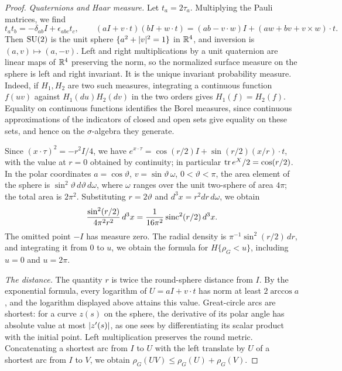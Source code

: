 \begin{proof}
\emph{Quaternions and Haar measure.} Let $t_a=2\tau_a$. Multiplying the Pauli matrices, we find
\begin{equation}\label{ch02:eq:quaternion-product}
 t_at_b=-\delta_{ab}I+\epsilon_{abc}t_c,\qquad
 (aI+v\cdot t)(bI+w\cdot t)=(ab-v\cdot w)I+(aw+bv+v\times w)\cdot t.
\end{equation}
Then $\mathrm{SU}(2)$ is the unit sphere $\{a^2+\lvert v\rvert^2=1\}$ in $\mathbb R^4$, and inversion is $(a,v)\mapsto(a,-v)$. Left and right multiplications by a unit quaternion are linear maps of $\mathbb R^4$ preserving the norm, so the normalized surface measure on the sphere is left and right invariant. It is the unique invariant probability measure. Indeed, if $H_1,H_2$ are two such measures, integrating a continuous function $f(uv)$ against $H_1(du)H_2(dv)$ in the two orders gives $H_1(f)=H_2(f)$. Equality on continuous functions identifies the Borel measures, since continuous approximations of the indicators of closed and open sets give equality on these sets, and hence on the $\sigma$-algebra they generate.

Since $(x\cdot\tau)^2=-r^2I/4$, we have $e^{x\cdot\tau}=\cos(r/2)I+\sin(r/2)(x/r)\cdot t$, with the value at $r=0$ obtained by continuity; in particular $\operatorname{tr} e^X/2=\cos(r/2)$. In the polar coordinates $a=\cos\vartheta$, $v=\sin\vartheta\,\omega$, $0<\vartheta<\pi$, the area element of the sphere is $\sin^2\vartheta\,d\vartheta\,d\omega$, where $\omega$ ranges over the unit two-sphere of area $4\pi$; the total area is $2\pi^2$. Substituting $r=2\vartheta$ and $d^3x=r^2dr\,d\omega$, we obtain
\[
 \frac{\sin^2(r/2)}{4\pi^2r^2}\,d^3x=\frac1{16\pi^2}\operatorname{sinc}^2(r/2)\,d^3x.
\]
The omitted point $-I$ has measure zero. The radial density is $\pi^{-1}\sin^2(r/2)\,dr$, and integrating it from $0$ to $u$, we obtain the formula for $H\{\rho_G<u\}$, including $u=0$ and $u=2\pi$.

\emph{The distance.} The quantity $r$ is twice the round-sphere distance from $I$. By the exponential formula, every logarithm of $U=aI+v\cdot t$ has norm at least $2\arccos a$, and the logarithm displayed above attains this value. Great-circle arcs are shortest: for a curve $z(s)$ on the sphere, the derivative of its polar angle has absolute value at most $\lvert z'(s)\rvert$, as one sees by differentiating its scalar product with the initial point. Left multiplication preserves the round metric. Concatenating a shortest arc from $I$ to $U$ with the left translate by $U$ of a shortest arc from $I$ to $V$, we obtain $\rho_G(UV)\le\rho_G(U)+\rho_G(V)$.


\end{proof}
